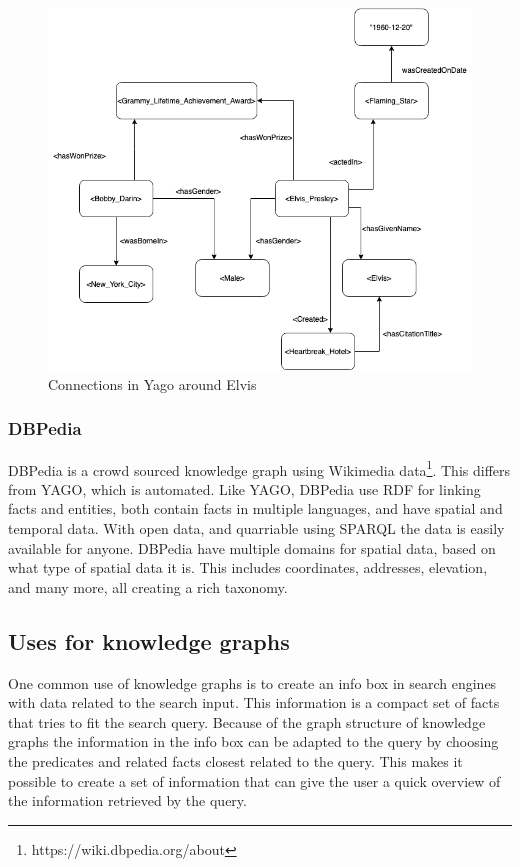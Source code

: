 \begin{figure}
  \centering
  \includegraphics[scale=0.5]{figs/yagoExample.png}
 \caption{Connections in Yago around Elvis}
 \label{fig:Elvis}
\end{figure}
 
\subsubsection{DBPedia}
DBPedia is a crowd sourced knowledge graph using Wikimedia data\footnote{https://wiki.dbpedia.org/about}. This differs from YAGO, which is automated. Like YAGO, DBPedia use RDF for linking facts and entities, both contain facts in multiple languages, and have spatial and temporal data. With open data, and quarriable using SPARQL the data is easily available for anyone. DBPedia have multiple domains for spatial data, based on what type of spatial data it is. This includes coordinates, addresses, elevation, and many more, all creating a rich taxonomy.

\subsection{Uses for knowledge graphs}
One common use of knowledge graphs is to create an info box in search engines with data related to the search input. This information is a compact set of facts that tries to fit the search query. Because of the graph structure of knowledge graphs the information in the info box can be adapted to the query by choosing the predicates and related facts closest related to the query. This makes it possible to create a set of information that can give the user a quick overview of the information retrieved by the query.

